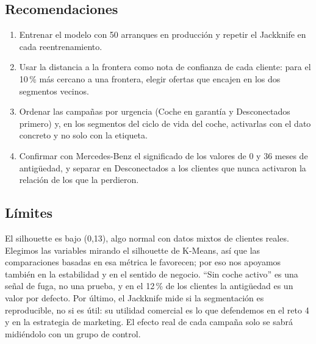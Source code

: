 \documentclass[11pt,a4paper]{article}
\begin{document}
\subsection*{Recomendaciones}

\begin{enumerate}
  \item Entrenar el modelo con 50 arranques en producción y repetir el Jackknife en cada reentrenamiento.
  \item Usar la distancia a la frontera como nota de confianza de cada cliente: para el 10\,\% más cercano a una frontera, elegir ofertas que encajen en los dos segmentos vecinos.
  \item Ordenar las campañas por urgencia (Coche en garantía y Desconectados primero) y, en los segmentos del ciclo de vida del coche, activarlas con el dato concreto y no solo con la etiqueta.
  \item Confirmar con Mercedes-Benz el significado de los valores de 0 y 36 meses de antigüedad, y separar en Desconectados a los clientes que nunca activaron la relación de los que la perdieron.
\end{enumerate}

\subsection*{Límites}

El silhouette es bajo (0,13), algo normal con datos mixtos de clientes reales. Elegimos las variables mirando el silhouette de K-Means, así que las comparaciones basadas en esa métrica le favorecen; por eso nos apoyamos también en la estabilidad y en el sentido de negocio. ``Sin coche activo'' es una señal de fuga, no una prueba, y en el 12\,\% de los clientes la antigüedad es un valor por defecto. Por último, el Jackknife mide si la segmentación es reproducible, no si es útil: su utilidad comercial es lo que defendemos en el reto 4 y en la estrategia de marketing. El efecto real de cada campaña solo se sabrá midiéndolo con un grupo de control.
\end{document}

